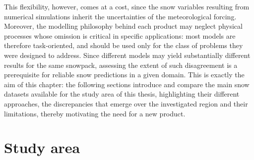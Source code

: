 This flexibility, however, comes at a cost, since the snow variables resulting from numerical simulations inherit the uncertainties of the meteorological 
forcing. Moreover, the modelling philosophy behind each product may neglect physical processes whose omission is critical in specific applications: 
most models are therefore task-oriented, and should be used only for the class of problems they were designed to address. Since different models may yield 
substantially different results for the same snowpack, assessing the extent of such disagreement is a prerequisite for reliable snow predictions 
in a given domain. This is exactly the aim of this chapter: the following sections introduce and compare the main snow datasets available for the study 
area of this thesis, highlighting their different approaches, the discrepancies that emerge over the investigated region and their limitations, 
thereby motivating the need for a new product. 










\section{Study area}


